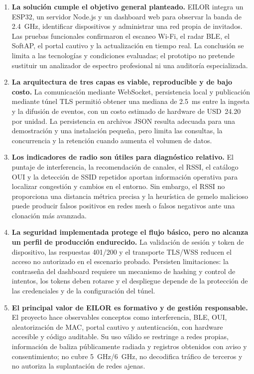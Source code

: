 \begin{enumerate}[leftmargin=1.8em]
  \item \textbf{La solución cumple el objetivo general planteado.} EILOR integra
  un ESP32, un servidor Node.js y un dashboard web para observar la banda de
  2.4~GHz, identificar dispositivos y administrar una red propia de invitados.
  Las pruebas funcionales confirmaron el escaneo Wi\nobreakdash-Fi, el radar BLE,
  el SoftAP, el portal cautivo y la actualización en tiempo real. La conclusión
  se limita a las tecnologías y condiciones evaluadas; el prototipo no pretende
  sustituir un analizador de espectro profesional ni una auditoría especializada.

  \item \textbf{La arquitectura de tres capas es viable, reproducible y de bajo
  costo.} La comunicación mediante WebSocket, persistencia local y publicación
  mediante túnel TLS permitió obtener una mediana de 2.5~ms entre la ingesta y la
  difusión de eventos, con un costo estimado de hardware de USD~24.20 por unidad.
  La persistencia en archivos JSON resulta adecuada para una demostración y una
  instalación pequeña, pero limita las consultas, la concurrencia y la retención
  cuando aumenta el volumen de datos.

  \item \textbf{Los indicadores de radio son útiles para diagnóstico relativo.}
  El puntaje de interferencia, la recomendación de canales, el RSSI, el catálogo
  OUI y la detección de SSID repetidos aportan información operativa para localizar
  congestión y cambios en el entorno. Sin embargo, el RSSI no proporciona una
  distancia métrica precisa y la heurística de gemelo malicioso puede producir
  falsos positivos en redes mesh o falsos negativos ante una clonación más avanzada.

  \item \textbf{La seguridad implementada protege el flujo básico, pero no alcanza
  un perfil de producción endurecido.} La validación de sesión y token de
  dispositivo, las respuestas 401/200 y el transporte TLS/WSS reducen el acceso no
  autorizado en el escenario probado. Persisten limitaciones: la contraseña del
  dashboard requiere un mecanismo de hashing y control de intentos, los tokens
  deben rotarse y el despliegue depende de la protección de las credenciales y de
  la configuración del túnel.

  \item \textbf{El principal valor de EILOR es formativo y de gestión responsable.}
  El proyecto hace observables conceptos como interferencia, BLE, OUI,
  aleatorización de MAC, portal cautivo y autenticación, con hardware accesible y
  código auditable. Su uso válido se restringe a redes propias, información de
  baliza públicamente radiada y registros obtenidos con aviso y consentimiento;
  no cubre 5~GHz/6~GHz, no decodifica tráfico de terceros y no autoriza la
  suplantación de redes ajenas.
\end{enumerate}

